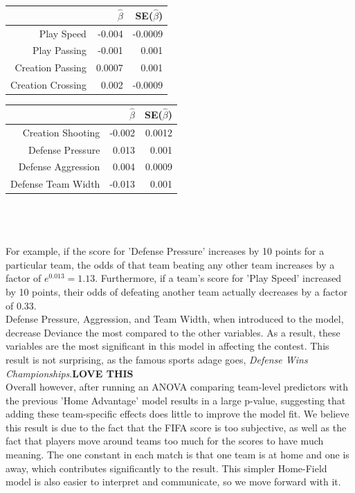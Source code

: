 \documentclass{article}
\begin{document}
\begin{tabular}{rrr}
  \hline
 & $\hat{\beta}$ & SE($\hat{\beta}$)\\ 
  \hline
Play Speed  & -0.004 & -0.0009 \\
Play Passing  & -0.001 & 0.001 \\
Creation Passing  & 0.0007 & 0.001 \\
Creation Crossing  & 0.002 & -0.0009 \\
   \hline
\end{tabular}
\quad
\begin{tabular}{rrr}
  \hline
 & $\hat{\beta}$ & SE($\hat{\beta}$)\\ 
  \hline
Creation Shooting & -0.002 & 0.0012 \\
Defense Pressure  & 0.013 & 0.001 \\
Defense Aggression & 0.004 & 0.0009 \\
Defense Team Width  & -0.013 & 0.001 \\
   \hline
\end{tabular}\\
\\
\\
For example, if the score for 'Defense Pressure' increases by 10 points for a particular team, the odds of that team beating any other team increases by a factor of $e^{0.013} = 1.13$. Furthermore, if a team's score for 'Play Speed' increased by 10 points, their odds of defeating another team actually decreases by a factor of 0.33.\\

Defense Pressure, Aggression, and Team Width, when introduced to the model, decrease Deviance the most compared to the other variables. As a result, these variables are the most significant in this model in affecting the contest. This result is not surprising, as the famous sports adage goes, \textit{Defense Wins Championships}.\textbf{LOVE THIS}\\

Overall however, after running an ANOVA comparing team-level predictors with the previous 'Home Advantage' model results in a large p-value, suggesting that adding these team-specific effects does little to improve the model fit. We believe this result is due to the fact that the FIFA score is too subjective, as well as the fact that players move around teams too much for the scores to have much meaning. The one constant in each match is that one team is at home and one is away, which contributes significantly to the result. This simpler Home-Field model is also easier to interpret and communicate, so we move forward with it.
\end{document}
